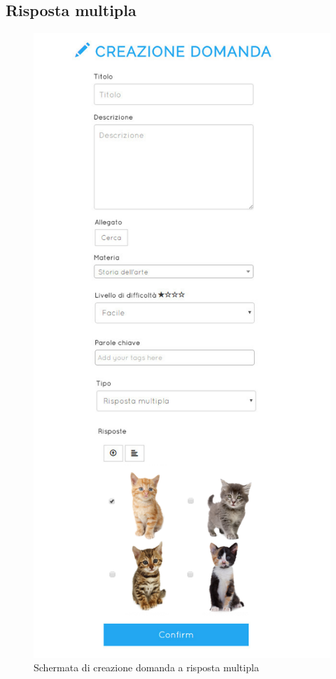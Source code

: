 \documentclass[a4paper, titlepage]{article}
\begin{document}
	 \subsection{Risposta multipla}
	 \begin{figure}[!h]
	 	\centering
	 	\includegraphics[scale=0.33]{Img/screen_CreazioneDomandaRMultipla.png}
	 	\caption{Schermata di creazione domanda a risposta multipla}
	 \end{figure}
\end{document}
